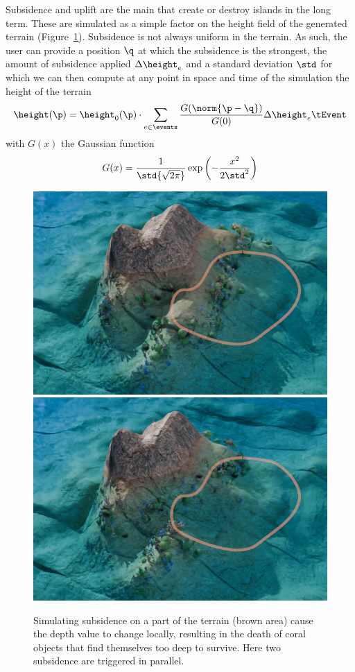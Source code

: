Subsidence and uplift are the main  that create or destroy islands in the long term. These  are simulated as a simple factor on the height field of the generated terrain (Figure~\ref{fig:semantic-representation_subsidence-event}). Subsidence is not always uniform in the terrain. As such, the user can provide a position $\q$ at which the subsidence is the strongest, the amount of subsidence applied $\Delta \height_e$ and a standard deviation $\std$ for which we can then compute at any point in space and time of the simulation the height of the terrain
\begin{align*}
    \height(\p) = \height_0(\p) \cdot \sum_{e \in \events}{\frac{G(\norm{\p - \q})}{G(0)}} \Delta \height_e \tEvent 
\end{align*}
with $G(x)$ the Gaussian function
\begin{align*}
    G(x) = {\frac {1}{\std {\sqrt {2\pi }}}} \exp \left(-\frac {x^{2}}{2 \std ^{2}}\right)
\end{align*}

\begin{figure}
    \includegraphics[width = 0.45 \linewidth]{Figures/Interactions/InteractionSubsidence1.png}
    \includegraphics[width = 0.45 \linewidth]{Figures/Interactions/InteractionSubsidence2.png}
    \caption{Simulating subsidence on a part of the terrain (brown area) cause the depth value to change locally, resulting in the death of coral objects that find themselves too deep to survive. Here two subsidence  are triggered in parallel. }
    \label{fig:semantic-representation_subsidence-event}
\end{figure}


